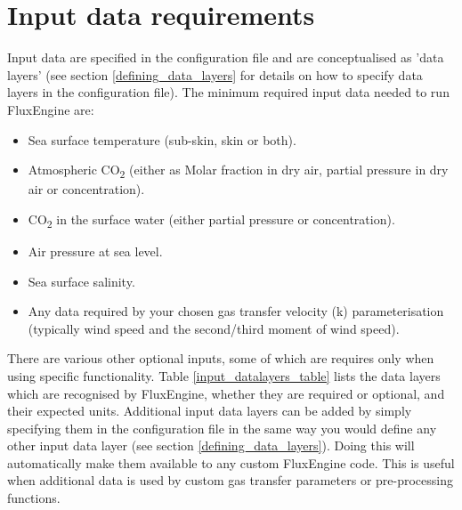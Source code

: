 \documentclass[]{scrartcl}
\begin{document}
\section{Input data requirements}
Input data are specified in the configuration file and are conceptualised as 'data layers' (see section \ref{defining_data_layers} for details on how to specify data layers in the configuration file). The minimum required input data needed to run FluxEngine are:
\begin{itemize}
	\item Sea surface temperature (sub-skin, skin or both).
	\item Atmospheric CO\textsubscript{2} (either as Molar fraction in dry air, partial pressure in dry air or concentration).
	\item CO\textsubscript{2} in the surface water (either partial pressure or concentration).
	\item Air pressure at sea level.
	\item Sea surface salinity.
	\item Any data required by your chosen gas transfer velocity (k) parameterisation (typically wind speed and the second/third moment of wind speed).
\end{itemize}

There are various other optional inputs, some of which are requires only when using specific functionality. Table \ref{input_datalayers_table} lists the data layers which are recognised by FluxEngine, whether they are required or optional, and their expected units. Additional input data layers can be added by simply specifying them in the configuration file in the same way you would define any other input data layer (see section \ref{defining_data_layers}). Doing this will automatically make them available to any custom FluxEngine code. This is useful when additional data is used by custom gas transfer parameters or pre-processing functions.
\end{document}
